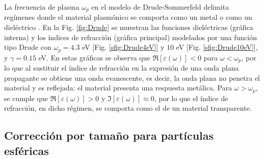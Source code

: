 La frecuencia de plasma $\omega_p$ en el modelo de Drude-Sommerfeld delimita regímenes donde el material plasmónico se comporta como un metal o como un dieléctrico \cite{trugler2011properties}.   En la Fig.  \ref{fig:Drude} se muestran las funciones dieléctricas (gráfica interna) y los índices de refracción  (gráfica principal) modelados por una función tipo Drude con $\omega_p=4. 3$ eV [Fig.  \ref{sfig:Drude4eV}] y $10$ eV [Fig.  \ref{sfig:Drude10eV}], y $\gamma=0. 15$ eV.  En estas gráficas se observa que $\Re[\varepsilon(\omega)]<0$ para $\omega<\omega_p$, por lo que al sustituir el índice de refracción en la expresión de una onda plana propagante se obtiene una onda evanescente, es decir, la onda plana no penetra el material y es reflejada: el material presenta una respuesta metálica.  Para $\omega>\omega_p$, se cumple que $\Re[\varepsilon(\omega)]>0$ y $\Im[\varepsilon(\omega)]\approx 0$, por lo que el índice de refracción, en dicho régimen, se comporta como el de un  material transparente. 

\subsection{Corrección por tamaño para partículas esféricas}

